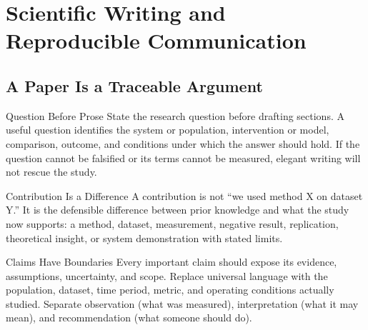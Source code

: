 
\chapter{Scientific Writing and Reproducible Communication}

\label{ch:scientific-writing}

\section{A Paper Is a Traceable Argument}

\begin{v3topic}{Question Before Prose}
State the research question before drafting sections.
A useful question identifies the system or population, intervention or model,
comparison, outcome, and conditions under which the answer should hold.
If the question cannot be falsified or its terms cannot be measured, elegant
writing will not rescue the study.

\end{v3topic}
\begin{v3topic}{Contribution Is a Difference}
A contribution is not ``we used method X on dataset Y.''
It is the defensible difference between prior knowledge and what the study now
supports: a method, dataset, measurement, negative result, replication,
theoretical insight, or system demonstration with stated limits.

\end{v3topic}
\begin{v3topic}{Claims Have Boundaries}
Every important claim should expose its evidence, assumptions, uncertainty,
and scope.
Replace universal language with the population, dataset, time period, metric,
and operating conditions actually studied.
Separate observation (what was measured), interpretation (what it may mean),
and recommendation (what someone should do).
\end{v3topic}

